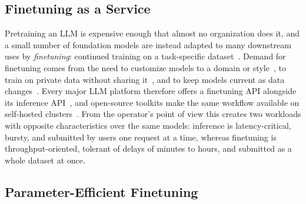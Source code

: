 \subsection{Finetuning as a Service}
\label{background:subsec:finetuning_service}

Pretraining an LLM is expensive enough that almost no organization does it, and a small number of foundation models are instead adapted to many downstream uses by \emph{finetuning}: continued training on a task-specific dataset~\cite{devlin2018bert,radford2019language,brown2020language,houlsby2019parameter,zhang2021share}.
Demand for finetuning comes from the need to customize models to a domain or style~\cite{liu2024customizing}, to train on private data without sharing it~\cite{tan2024democratizing}, and to keep models current as data changes~\cite{gao2023unified}.
Every major LLM platform therefore offers a finetuning API alongside its inference API~\cite{openaifinetuning,googlefinetuning,databricksfinetuning}, and open-source toolkits make the same workflow available on self-hosted clusters~\cite{peft,llamafactory,transformers}.
From the operator's point of view this creates two workloads with opposite characteristics over the same models: inference is latency-critical, bursty, and submitted by users one request at a time, whereas finetuning is throughput-oriented, tolerant of delays of minutes to hours, and submitted as a whole dataset at once.

\subsection{Parameter-Efficient Finetuning}
\label{background:subsec:peft_methods}

